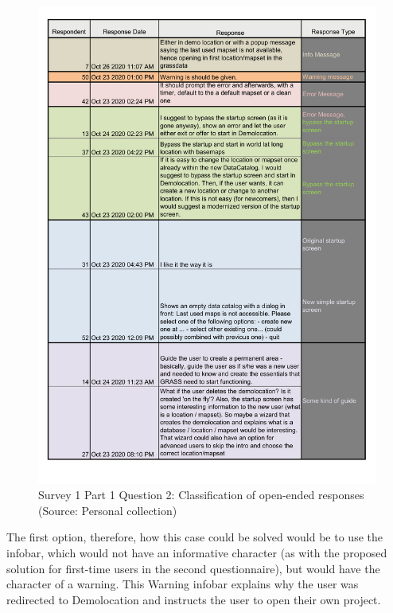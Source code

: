 \documentclass[a4paper,10pt,twoside]{article}
\begin{document}
\vspace{0.3cm}
\begin{figure}[hbt!] 
\begin{center}
\includegraphics[width=15cm]{../surveys/analyzed_data/survey1_part1_question2_other_answers.pdf} 
\caption[Survey 1 Part 1 Question 2: Classification of open-ended responses]{Survey 1 Part 1 Question 2: Classification of open-ended responses (Source: Personal collection)}
\label{fig:survey1_part1_question2_other_answers}
\end{center}
\end{figure}

\newpage
\noindent The first option, therefore, how this case could be solved
would be to use the infobar, which would not have an informative
character (as with the proposed solution for first-time users in the
second questionnaire), but would have the character of a warning. This
Warning infobar explains why the user was redirected to Demolocation
and instructs the user to open their own project.
\end{document}
